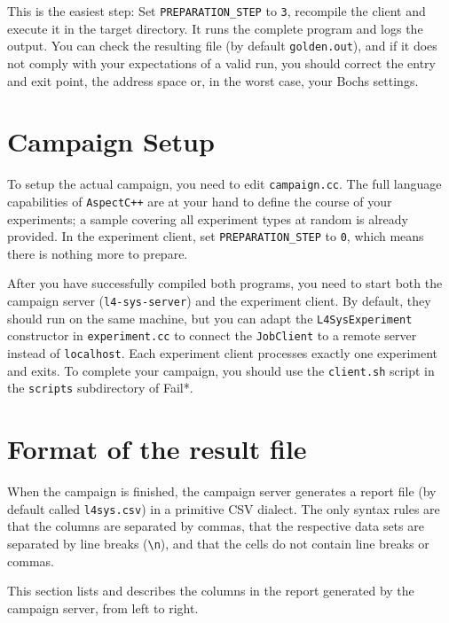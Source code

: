 \documentclass[a4paper,10pt]{article}
\begin{document}
This is the easiest step: Set \verb+PREPARATION_STEP+ to \texttt{3},
recompile the client and execute it in the target directory.
It runs the complete program and logs the output. You can
check the resulting file (by default \texttt{golden.out}),
and if it does not comply with your expectations of a valid
run, you should correct the entry and exit point, the address space
or, in the worst case, your Bochs settings.

\section{Campaign Setup}

To setup the actual campaign, you need to edit \texttt{campaign.cc}.
The full language capabilities of \texttt{AspectC++} are at your hand to define
the course of your experiments; a sample covering all experiment
types at random is already provided. In the experiment client,
set \verb+PREPARATION_STEP+ to \texttt{0}, which means there is nothing more
to prepare.

After you have successfully compiled both programs, you need to
start both the campaign server (\texttt{l4-sys-server})
and the experiment client. By default, they should run on the
same machine, but you can adapt the \texttt{L4SysExperiment}
constructor in \texttt{experiment.cc} to connect the \texttt{JobClient}
to a remote server instead of \texttt{localhost}. Each experiment client processes
exactly one experiment and exits. To complete your campaign,
you should use the \texttt{client.sh} script in the \texttt{scripts}
subdirectory of Fail*.

\section{Format of the result file}

When the campaign is finished, the campaign server generates a report
file (by default called \texttt{l4sys.csv}) in a primitive CSV dialect.
The only syntax rules are that the columns are separated by commas,
that the respective data sets are separated by line breaks (\verb+\n+),
and that the cells do not contain line breaks or commas.

This section lists and describes the columns in the report generated by
the campaign server, from left to right.
\end{document}
